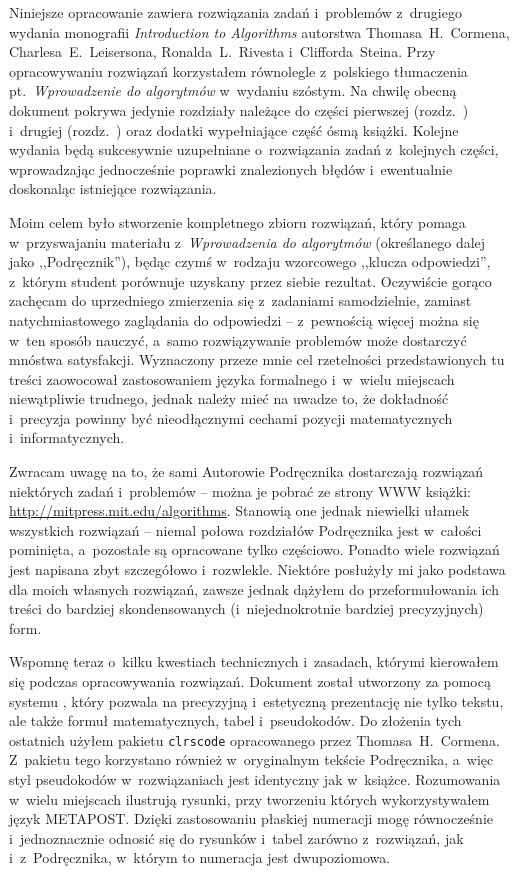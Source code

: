 
Niniejsze opracowanie zawiera rozwiązania zadań i~problemów z~drugiego wydania monografii \textsl{Introduction to Algorithms} \cite{cormen} autorstwa Thomasa~H.~Cormena, Charlesa~E.~Leisersona, Ronalda~L.~Rivesta i~Clifforda~Steina.
Przy opracowywaniu rozwiązań korzystałem równolegle z~polskiego tłumaczenia pt.~\textsl{Wprowadzenie do algorytmów} \cite{cormenpl} w~wydaniu szóstym.
Na chwilę obecną dokument pokrywa jedynie rozdziały należące do części pierwszej (rozdz.~) i~drugiej (rozdz.~) oraz dodatki wypełniające część ósmą książki.
Kolejne wydania będą sukcesywnie uzupełniane o~rozwiązania zadań z~kolejnych części, wprowadzając jednocześnie poprawki znalezionych błędów i~ewentualnie doskonaląc istniejące rozwiązania.

Moim celem było stworzenie kompletnego zbioru rozwiązań, który pomaga w~przyswajaniu materiału z~\textsl{Wprowadzenia do algorytmów} (określanego dalej jako ,,Podręcznik''), będąc czymś w~rodzaju wzorcowego ,,klucza odpowiedzi'', z~którym student porównuje uzyskany przez siebie rezultat.
Oczywiście gorąco zachęcam do uprzedniego zmierzenia się z~zadaniami samodzielnie, zamiast natychmiastowego zaglądania do odpowiedzi -- z~pewnością więcej można się w~ten sposób nauczyć, a~samo rozwiązywanie problemów może dostarczyć mnóstwa satysfakcji.
Wyznaczony przeze mnie cel rzetelności przedstawionych tu treści zaowocował zastosowaniem języka formalnego i~w~wielu miejscach niewątpliwie trudnego, jednak należy mieć na uwadze to, że dokładność i~precyzja powinny być nieodłącznymi cechami pozycji matematycznych i~informatycznych.

Zwracam uwagę na to, że sami Autorowie Podręcznika dostarczają rozwiązań niektórych zadań i~problemów -- można je pobrać ze strony WWW książki: \url{http://mitpress.mit.edu/algorithms}.
Stanowią one jednak niewielki ułamek wszystkich rozwiązań -- niemal połowa rozdziałów Podręcznika jest w~całości pominięta, a~pozostałe są opracowane tylko częściowo.
Ponadto wiele rozwiązań jest napisana zbyt szczegółowo i~rozwlekle.
Niektóre posłużyły mi jako podstawa dla moich własnych rozwiązań, zawsze jednak dążyłem do przeformułowania ich treści do bardziej skondensowanych (i~niejednokrotnie bardziej precyzyjnych) form.

Wspomnę teraz o~kilku kwestiach technicznych i~zasadach, którymi kierowałem się podczas opracowywania rozwiązań.
Dokument został utworzony za pomocą systemu \LaTeXe, który pozwala na precyzyjną i~estetyczną prezentację nie tylko tekstu, ale także formuł matematycznych, tabel i~pseudokodów.
Do złożenia tych ostatnich użyłem pakietu \texttt{clrscode} opracowanego przez Thomasa~H.~Cormena.
Z~pakietu tego korzystano również w~oryginalnym tekście Podręcznika, a~więc styl pseudokodów w~rozwiązaniach jest identyczny jak w~książce.
Rozumowania w~wielu miejscach ilustrują rysunki, przy tworzeniu których wykorzystywałem język {\manual META}{\manual POST}.
Dzięki zastosowaniu płaskiej numeracji mogę równocześnie i~jednoznacznie odnosić się do rysunków i~tabel zarówno z~rozwiązań, jak i~z~Podręcznika, w~którym to numeracja jest dwupoziomowa.

